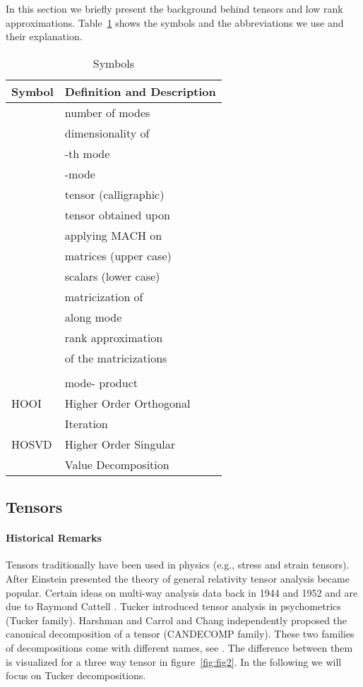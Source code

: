 In this section we briefly present the background behind tensors and low rank approximations. 
Table~\ref{tab:symbol} shows the symbols and the abbreviations we use and their explanation.

\begin{table}[htb]
\begin{center}
\begin{tabular}{|l|l|} \hline
Symbol & Definition and Description \\ \hline \hline
 & number of modes \\ \hline
 & dimensionality of \\ 
      &  -th mode \\ \hline 
 & -mode  \\ 
         & tensor (calligraphic) \\ \hline
 & tensor obtained upon  \\ 
                    & applying MACH on       \\ \hline
 & matrices (upper case)  \\ \hline
 & scalars (lower case)  \\ \hline
   & matricization of  \\
            & along mode  \\ \hline
 &   rank approximation  \\ 
            &  of the matricizations \\
			&  \\ \hline
 & mode- product  \\  \hline
HOOI & Higher Order Orthogonal \\ 
     & Iteration \cite{354405}  \\  \hline
HOSVD & Higher Order Singular \\
      & Value Decomposition \cite{citeulike:4308452}  \\ \hline
\end{tabular}
\caption{Symbols}
\label{tab:symbol}
\end{center}
\end{table}

\subsection{Tensors}

\paragraph{Historical Remarks}  Tensors traditionally have been used in physics (e.g., stress and strain tensors). 
After Einstein presented the theory of general relativity tensor analysis became popular.
Certain ideas on multi-way analysis data back in 1944 and 1952 and are due to Raymond Cattell \cite{cat1,cat2}.
Tucker introduced tensor analysis in psychometrics \cite{tucker3} (Tucker family). 
Harshman \cite{harshman} and Carrol and Chang \cite{carroll} independently
proposed the canonical decomposition of a tensor (CANDECOMP family). 
These two families of decompositions come with different names, see \cite{tamarasurvey}.
The difference between them is visualized for a three way tensor in figure~\ref{fig:fig2}.
In the following we will focus on Tucker decompositions. 

